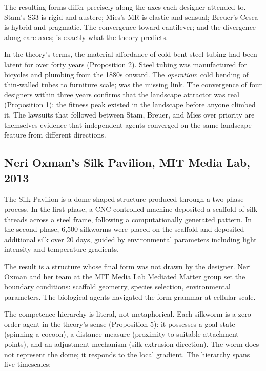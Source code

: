 The resulting forms differ precisely along the axes each designer attended to. Stam's S33 is rigid and austere; Mies's MR is elastic and sensual; Breuer's Cesca is hybrid and pragmatic. The convergence toward cantilever; and the divergence along care axes; is exactly what the theory predicts.

In the theory's terms, the material affordance of cold-bent steel tubing had been latent for over forty years (Proposition 2). Steel tubing was manufactured for bicycles and plumbing from the 1880s onward. The \textit{operation}; cold bending of thin-walled tubes to furniture scale; was the missing link. The convergence of four designers within three years confirms that the landscape attractor was real (Proposition 1): the fitness peak existed in the landscape before anyone climbed it. The lawsuits that followed between Stam, Breuer, and Mies over priority are themselves evidence that independent agents converged on the same landscape feature from different directions.

\subsection{Neri Oxman's Silk Pavilion, MIT Media Lab, 2013}

The Silk Pavilion is a dome-shaped structure produced through a two-phase process. In the first phase, a CNC-controlled machine deposited a scaffold of silk threads across a steel frame, following a computationally generated pattern. In the second phase, 6,500 silkworms were placed on the scaffold and deposited additional silk over 20 days, guided by environmental parameters including light intensity and temperature gradients.

The result is a structure whose final form was not drawn by the designer. Neri Oxman and her team at the MIT Media Lab Mediated Matter group set the boundary conditions: scaffold geometry, species selection, environmental parameters. The biological agents navigated the form grammar at cellular scale.

The competence hierarchy is literal, not metaphorical. Each silkworm is a zero-order agent in the theory's sense (Proposition 5): it possesses a goal state (spinning a cocoon), a distance measure (proximity to suitable attachment points), and an adjustment mechanism (silk extrusion direction). The worm does not represent the dome; it responds to the local gradient. The hierarchy spans five timescales:

